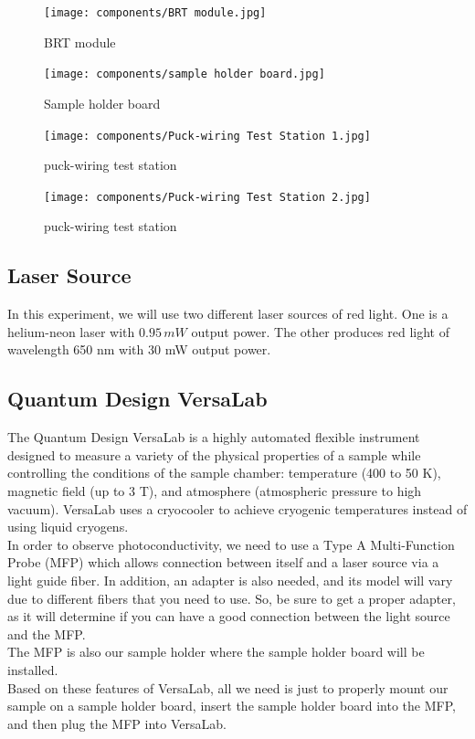 \documentclass{article}
\begin{document}
    \begin{figure}[H]
        \centering
        \texttt{[image: components/BRT module.jpg]}
        \caption{BRT module}
        \label{BRT}
    \end{figure}
    
    \begin{figure}[H]
        \centering
        \texttt{[image: components/sample holder board.jpg]}
        \caption{Sample holder board}
        \label{sample holder board}
    \end{figure}

    \begin{figure}[H]
        \centering
        \texttt{[image: components/Puck-wiring Test Station 1.jpg]}
        \caption{puck-wiring test station}
        \label{station1}
    \end{figure}

    \begin{figure}[H]
        \centering
        \texttt{[image: components/Puck-wiring Test Station 2.jpg]}
        \caption{puck-wiring test station}
        \label{station2}
    \end{figure}

    
    \subsection{Laser Source}
        In this experiment, we will use two different laser sources of red light. One is a helium-neon laser with $0.95\,mW$ output power. The other produces red light of wavelength 650 nm
        with 30 mW output power.

    \subsection{Quantum Design VersaLab}
        The Quantum Design VersaLab is a highly automated flexible instrument designed to measure a variety of the physical properties of a sample while controlling the conditions of the sample chamber: temperature (400 to 50 K), magnetic field (up to 3 T), and atmosphere (atmospheric pressure to high vacuum). VersaLab uses a cryocooler to achieve cryogenic temperatures instead of using liquid cryogens.\\
        In order to observe photoconductivity, we need to use a Type A Multi-Function Probe (MFP) which allows connection between itself and a laser source via a light guide fiber. In addition, an adapter is also needed, and its model will vary due to different fibers that you need to use. So, be sure to get a proper adapter, as it will determine if you can have a good connection between the light source and the MFP.\\
        The MFP is also our sample holder where the sample holder board will be installed.\\
        Based on these features of VersaLab, all we need is just to properly mount our sample on a sample holder board, insert the sample holder board into the MFP, and then plug the MFP into VersaLab.\\
\end{document}

